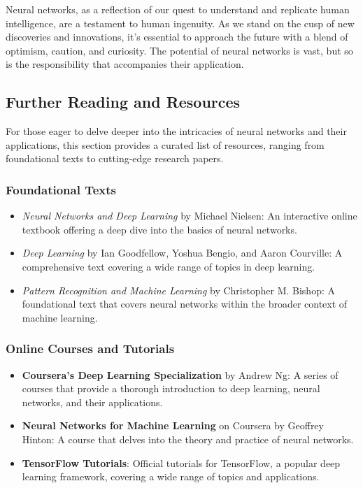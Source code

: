 Neural networks, as a reflection of our quest to understand and replicate human intelligence, are a testament to human ingenuity. As we stand on the cusp of new discoveries and innovations, it's essential to approach the future with a blend of optimism, caution, and curiosity. The potential of neural networks is vast, but so is the responsibility that accompanies their application.

\subsection{Further Reading and Resources}

For those eager to delve deeper into the intricacies of neural networks and their applications, this section provides a curated list of resources, ranging from foundational texts to cutting-edge research papers.

\subsubsection{Foundational Texts}

\begin{itemize}
    \item \textit{Neural Networks and Deep Learning} by Michael Nielsen: An interactive online textbook offering a deep dive into the basics of neural networks.
    \item \textit{Deep Learning} by Ian Goodfellow, Yoshua Bengio, and Aaron Courville: A comprehensive text covering a wide range of topics in deep learning.
    \item \textit{Pattern Recognition and Machine Learning} by Christopher M. Bishop: A foundational text that covers neural networks within the broader context of machine learning.
\end{itemize}

\subsubsection{Online Courses and Tutorials}

\begin{itemize}
    \item \textbf{Coursera's Deep Learning Specialization} by Andrew Ng: A series of courses that provide a thorough introduction to deep learning, neural networks, and their applications.
    \item \textbf{Neural Networks for Machine Learning} on Coursera by Geoffrey Hinton: A course that delves into the theory and practice of neural networks.
    \item \textbf{TensorFlow Tutorials}: Official tutorials for TensorFlow, a popular deep learning framework, covering a wide range of topics and applications.
\end{itemize}

